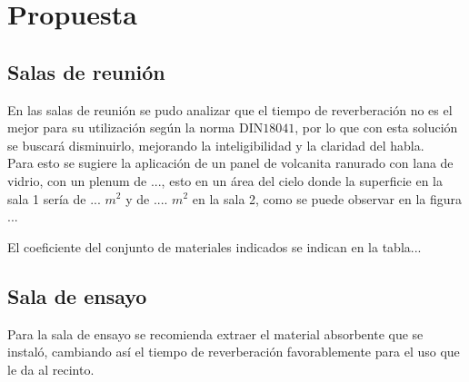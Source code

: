 \section{Propuesta}
\subsection{Salas de reunión}
En las salas de reunión se pudo analizar que el tiempo de reverberación no es el mejor para su 
utilización según la norma DIN$18041$, por lo que con esta solución se buscará disminuirlo, 
mejorando la inteligibilidad y la claridad del habla.\\
Para esto se sugiere la aplicación de un panel de volcanita ranurado con lana de vidrio, con un 
plenum de ..., esto en un área del cielo donde la superficie en la sala 1 sería de  ... $m^2$ 
y de .... $m^2$ en la sala 2, como se puede observar en la figura ...


El coeficiente del conjunto de materiales indicados se indican en la tabla...

\subsection{Sala de ensayo}
Para la sala de ensayo se recomienda extraer el material absorbente que se instaló, cambiando así el tiempo de reverberación favorablemente para el uso que le da al recinto.
